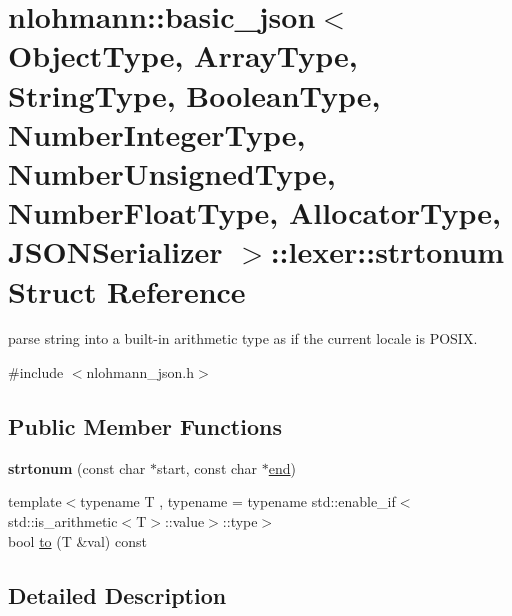 \hypertarget{structnlohmann_1_1basic__json_1_1lexer_1_1strtonum}{}\section{nlohmann\+:\+:basic\+\_\+json$<$ Object\+Type, Array\+Type, String\+Type, Boolean\+Type, Number\+Integer\+Type, Number\+Unsigned\+Type, Number\+Float\+Type, Allocator\+Type, J\+S\+O\+N\+Serializer $>$\+:\+:lexer\+:\+:strtonum Struct Reference}
\label{structnlohmann_1_1basic__json_1_1lexer_1_1strtonum}


parse string into a built-\/in arithmetic type as if the current locale is P\+O\+S\+IX.  




{\ttfamily \#include $<$nlohmann\+\_\+json.\+h$>$}

\subsection*{Public Member Functions}
\begin{DoxyCompactItemize}
\item 
\mbox{\label{structnlohmann_1_1basic__json_1_1lexer_1_1strtonum_ae065098e24b08ea79a359950190006d8}} 
{\bfseries strtonum} (const char $\ast$start, const char $\ast$\hyperlink{classnlohmann_1_1basic__json_a13e032a02a7fd8a93fdddc2fcbc4763c}{end})
\item 
{\footnotesize template$<$typename T , typename  = typename std\+::enable\+\_\+if$<$std\+::is\+\_\+arithmetic$<$\+T$>$\+::value$>$\+::type$>$ }\\bool \hyperlink{structnlohmann_1_1basic__json_1_1lexer_1_1strtonum_af1b3dc99a67a854750437a60a22f4989}{to} (T \&val) const
\end{DoxyCompactItemize}


\subsection{Detailed Description}
